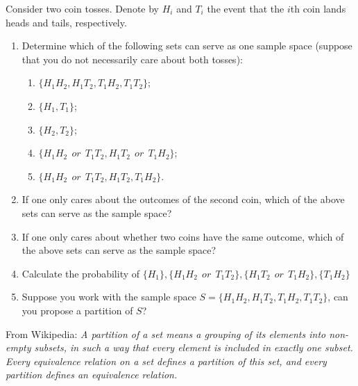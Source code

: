 \begin{exercise} \label{ex:chap01:01} 
	Consider two coin tosses. Denote by $H_i$ and $T_i$ the event that the $i$th coin lands heads and tails, respectively.
	\begin{enumerate}
		\item Determine which of the following sets can serve as one sample space (suppose that you do not necessarily care about both tosses):
		\begin{enumerate}
			\item $\{H_1H_2,H_1T_2,T_1H_2,T_1T_2\}$;
			\item $\{H_1, T_1\}$;
			\item $\{H_2, T_2\}$;
			\item $\{H_1H_2 ~~\textit{or}~~ T_1T_2,  H_1T_2 ~~\textit{or}~~ T_1H_2 \}$;
			\item $\{H_1H_2 ~~\textit{or}~~ T_1T_2,  H_1T_2 , T_1H_2 \}$.
		\end{enumerate}
		\item If one only cares about the outcomes of the second coin, which of the above sets can serve as the sample space? 
		\item If one only cares about whether two coins have the same outcome, which of the above sets can serve as the sample space? 
		\item Calculate the probability of $\{H_1\}, \{H_1H_2 ~~\textit{or}~~ T_1T_2\}, \{ H_1T_2 ~~\textit{or}~~ T_1H_2 \}, \{T_1H_2 \}$
		\item Suppose you work with the sample space $S=\{H_1H_2,H_1T_2,T_1H_2,T_1T_2\}$, can you propose a partition of $S$? 
	\end{enumerate}
	
	\begin{hint} 
		From Wikipedia: \textit{A partition of a set means a grouping of its elements into non-empty subsets, in such a way that every element is included in exactly one subset. Every equivalence relation on a set defines a partition of this set, and every partition defines an equivalence relation.}
	\end{hint}
	

\end{exercise}
